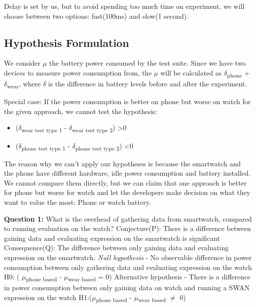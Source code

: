 Delay is set by us, but to avoid spending too much time on experiment, we will choose between two options: fast(100ms) and slow(1 second).

\subsection{ Hypothesis Formulation}

    We consider $\mu$ the battery power consumed by the test suite. Since we have two devices to measure power consumption from,
    the $\mu$ will be calculated as $\delta$\textsubscript{phone} +  $\delta$\textsubscript{wear}, where $\delta$ is the difference in battery levels 
    before and after the experiment.
    
    Special case:\label{special_case} If the power consumption is better on phone but worse on watch for the given approach, we cannot test the hypothesis:
    \begin{itemize}
     \item ($\delta$\textsubscript{wear test type 1} -  $\delta$\textsubscript{wear test type 2}) \textgreater  0
     \item  ($\delta$\textsubscript{phone test type 1} -  $\delta$\textsubscript{phone test type 2}) \textless  0 
    \end{itemize}
    
    The reason why we can't apply our hypotheses is because the smartwatch and the phone have different hardware, idle power consumption and 
    battery installed. We cannot compare them directly, but we can claim that one approach is better for phone but worse for watch and let the developers
    make decision on what they want to value the most: Phone or watch battery.

    \textbf{Question 1:} What is the overhead of gathering data from smartwatch, compared to running evaluation on the watch? \newline
Conjecture(P): There is a difference between gaining data and evaluating expression on the smartwatch is significant \newline
Consequence(Q): The difference between only gaining data and evaluating expression on the smartwatch. \newline
\textit{Null hypothesis} - No observable difference in power consumption between only gathering data and evaluating expression on the watch \newline
H0: ( $\mu$\textsubscript{phone based} - $\mu$\textsubscript{wear based} = 0) \newline
  Alternative hypothesis - There is a difference in power consumption between only gaining data on watch and running a SWAN expression on the watch \newline
H1:($\mu$\textsubscript{phone based} - $\mu$\textsubscript{wear based} $\neq$ 0)  \newline

